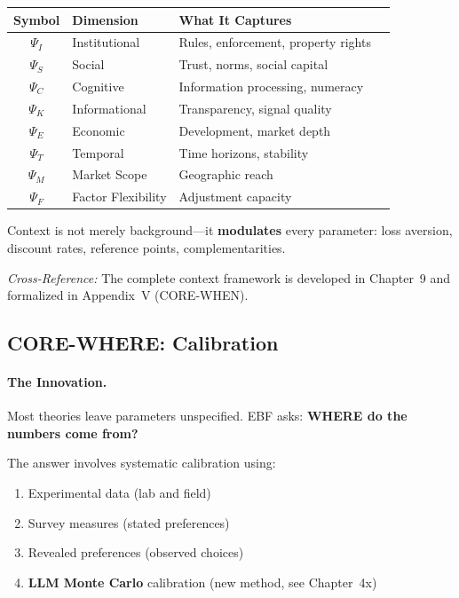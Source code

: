 \begin{center}
\small
\renewcommand{\arraystretch}{1.2}
\begin{tabular}{@{}clll@{}}
\toprule
\textbf{Symbol} & \textbf{Dimension} & \textbf{What It Captures} \\
\midrule
$\Psi_I$ & Institutional & Rules, enforcement, property rights \\
$\Psi_S$ & Social & Trust, norms, social capital \\
$\Psi_C$ & Cognitive & Information processing, numeracy \\
$\Psi_K$ & Informational & Transparency, signal quality \\
$\Psi_E$ & Economic & Development, market depth \\
$\Psi_T$ & Temporal & Time horizons, stability \\
$\Psi_M$ & Market Scope & Geographic reach \\
$\Psi_F$ & Factor Flexibility & Adjustment capacity \\
\bottomrule
\end{tabular}
\end{center}

Context is not merely background---it \textbf{modulates} every parameter:
loss aversion, discount rates, reference points, complementarities.

\textit{Cross-Reference:} The complete context framework is developed in
Chapter~9 and formalized in Appendix~V (CORE-WHEN).

\subsection{CORE-WHERE: Calibration}
\label{sec:8c-where}

\paragraph{The Innovation.}
Most theories leave parameters unspecified. EBF asks: \textbf{WHERE do
the numbers come from?}

The answer involves systematic calibration using:
\begin{enumerate}
\item Experimental data (lab and field)
\item Survey measures (stated preferences)
\item Revealed preferences (observed choices)
\item \textbf{LLM Monte Carlo} calibration (new method, see Chapter~4x)
\end{enumerate}

